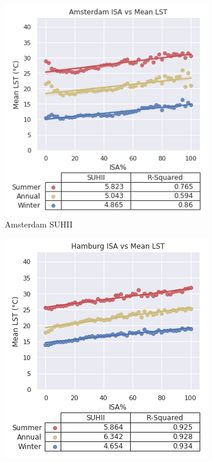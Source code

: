 \documentclass{article}
\begin{document}
\begin{figure}[!htb]
    \begin{subfigure}{0.333\textwidth}
        \centering
        \includegraphics[width=1\linewidth]{Amsterdam3000.png}
        \caption{Amsterdam SUHII}
        \label{fig:subim1}
    \end{subfigure}\hfill
    \begin{subfigure}{0.333\textwidth}
        \centering
        \includegraphics[width=1\linewidth]{Hamburg3000.png}

\end{subfigure}
\end{figure}
\end{document}
